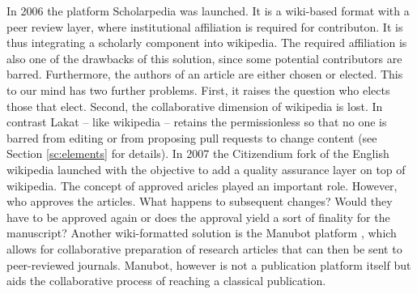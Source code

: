 In 2006 the platform Scholarpedia \cite{izhikevich_scholarpedia} was launched. It is a wiki-based format with a peer review layer, where institutional affiliation is required for contributon. It is thus integrating a scholarly component into wikipedia. The required affiliation is also one of the drawbacks of this solution, since some potential contributors are barred. Furthermore, the authors of an article are either chosen or elected. This to our mind has two further problems. First, it raises the question who elects those that elect. Second, the collaborative dimension of wikipedia is lost. In contrast Lakat -- like wikipedia -- retains the permissionless so that no one is barred from editing or from proposing pull requests to change content (see Section \ref{sc:elements} for details). In 2007 the Citizendium fork of the English wikipedia launched \cite{sanger_citizendium} with the objective to add a quality assurance layer on top of wikipedia. The concept of approved aricles played an important role. However, who approves the articles. What happens to subsequent changes? Would they have to be approved again or does the approval yield a sort of finality for the manuscript?
Another wiki-formatted solution is the Manubot platform \cite{himmelstein2019open, himmelstein_manubot}, which allows for collaborative preparation of research articles that can then be sent to peer-reviewed journals. Manubot, however is not a publication platform itself but aids the collaborative process of reaching a classical publication. 


